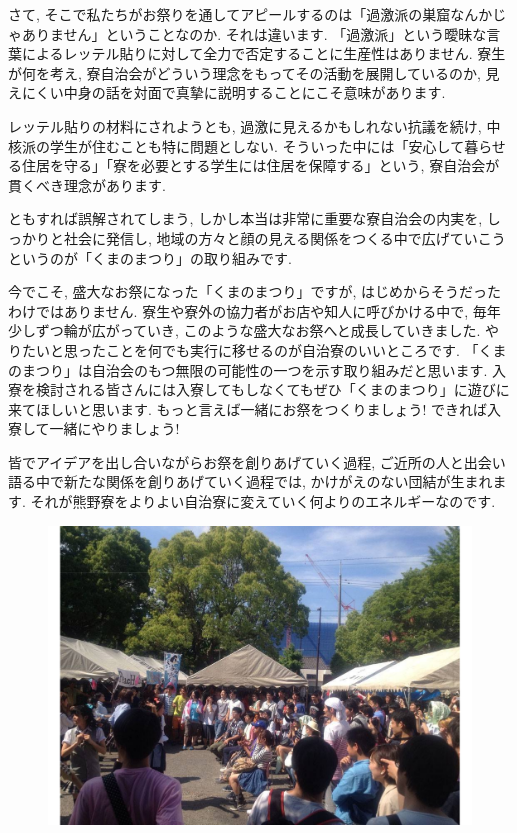 \documentclass[10pt,b5jsbook,dvips,dvipdfmx,openany]{jsbook}
\theoremstyle{definition}
\begin{document}
 		さて, そこで私たちがお祭りを通してアピールするのは「過激派の巣窟なんかじゃありません」ということなのか. それは違います. 「過激派」という曖昧な言葉によるレッテル貼りに対して全力で否定することに生産性はありません. 寮生が何を考え, 寮自治会がどういう理念をもってその活動を展開しているのか, 見えにくい中身の話を対面で真摯に説明することにこそ意味があります. 
		
 		レッテル貼りの材料にされようとも, 過激に見えるかもしれない抗議を続け, 中核派の学生が住むことも特に問題としない. そういった中には「安心して暮らせる住居を守る」「寮を必要とする学生には住居を保障する」という, 寮自治会が貫くべき理念があります. 

 		ともすれば誤解されてしまう, しかし本当は非常に重要な寮自治会の内実を, しっかりと社会に発信し, 地域の方々と顔の見える関係をつくる中で広げていこうというのが「くまのまつり」の取り組みです.  
 
		今でこそ, 盛大なお祭になった「くまのまつり」ですが, はじめからそうだったわけではありません. 寮生や寮外の協力者がお店や知人に呼びかける中で, 毎年少しずつ輪が広がっていき, このような盛大なお祭へと成長していきました. やりたいと思ったことを何でも実行に移せるのが自治寮のいいところです. 「くまのまつり」は自治会のもつ無限の可能性の一つを示す取り組みだと思います. 入寮を検討される皆さんには入寮してもしなくてもぜひ「くまのまつり」に遊びに来てほしいと思います. もっと言えば一緒にお祭をつくりましょう! できれば入寮して一緒にやりましょう! 

		皆でアイデアを出し合いながらお祭を創りあげていく過程, ご近所の人と出会い語る中で新たな関係を創りあげていく過程では, かけがえのない団結が生まれます. それが熊野寮をよりよい自治寮に変えていく何よりのエネルギーなのです. 
	\begin{figure}[h]
		\begin{flushleft}
 	 	\includegraphics[scale=0.3]{kumano_fes2.pdf}
		\end{flushleft}
		\end{figure}
\end{document}
